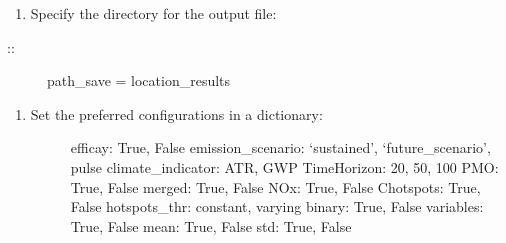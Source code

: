 \documentclass[a4paper,11pt,english]{sphinxmanual}
\begin{document}
\begin{sphinxVerbatim}[commandchars=\\\{\}]
     
\end{sphinxVerbatim}
\begin{enumerate}
%
\setcounter{enumi}{2}
\item {} 
\sphinxAtStartPar
Specify the directory for the output file:

\end{enumerate}
\begin{description}
\item[{::}] \leavevmode
\sphinxAtStartPar
path\_save = location\_results

\end{description}
\begin{enumerate}
%
\setcounter{enumi}{3}
\item {} \begin{description}
\item[{Set the preferred configurations in a dictionary:}] \leavevmode
\sphinxAtStartPar
efficay: True, False
emission\_scenario: ‘sustained’, ‘future\_scenario’, pulse
climate\_indicator: ATR, GWP
TimeHorizon: 20, 50, 100
PMO: True, False
merged: True, False
NOx: True, False
Chotspots: True, False
hotspots\_thr: constant, varying
binary: True, False
variables: True, False
mean: True, False
std: True, False

\end{description}

\end{enumerate}
\end{document}
